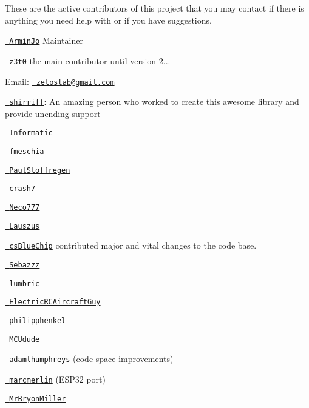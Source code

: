 These are the active contributors of this project that you may contact if there is anything you need help with or if you have suggestions.


\begin{DoxyItemize}
\item \href{https://github.com/ArminJo}{\texttt{ Armin\+Jo}} Maintainer
\item \href{https://github.com/z3t0}{\texttt{ z3t0}} the main contributor until version 2...
\begin{DoxyItemize}
\item Email\+: \href{mailto:zetoslab@gmail.com}{\texttt{ zetoslab@gmail.\+com}}
\end{DoxyItemize}
\item \href{https://github.com/shirriff}{\texttt{ shirriff}}\+: An amazing person who worked to create this awesome library and provide unending support
\item \href{https://github.com/Informatic}{\texttt{ Informatic}}
\item \href{https://github.com/fmeschia}{\texttt{ fmeschia}}
\item \href{https://github.com/paulstroffregen}{\texttt{ Paul\+Stoffregen}}
\item \href{https://github.com/crash7}{\texttt{ crash7}}
\item \href{https://github.com/neco777}{\texttt{ Neco777}}
\item \href{https://github.com/lauszus}{\texttt{ Lauszus}}
\item \href{https://github.com/csbluechip}{\texttt{ cs\+Blue\+Chip}} contributed major and vital changes to the code base.
\item \href{https://github.com/sebazz}{\texttt{ Sebazzz}}
\item \href{https://github.com/lumbric}{\texttt{ lumbric}}
\item \href{https://github.com/electricrcaircraftguy}{\texttt{ Electric\+RCAircraft\+Guy}}
\item \href{https://github.com/philipphenkel}{\texttt{ philipphenkel}}
\item \href{https://github.com/MCUdude}{\texttt{ MCUdude}}
\item \href{https://github.com/adamlhumphreys}{\texttt{ adamlhumphreys}} (code space improvements)
\item \href{https://github.com/marcmerlin}{\texttt{ marcmerlin}} (ESP32 port)
\item \href{https://github.com/MrBryonMiller}{\texttt{ Mr\+Bryon\+Miller}}

\end{DoxyItemize}
